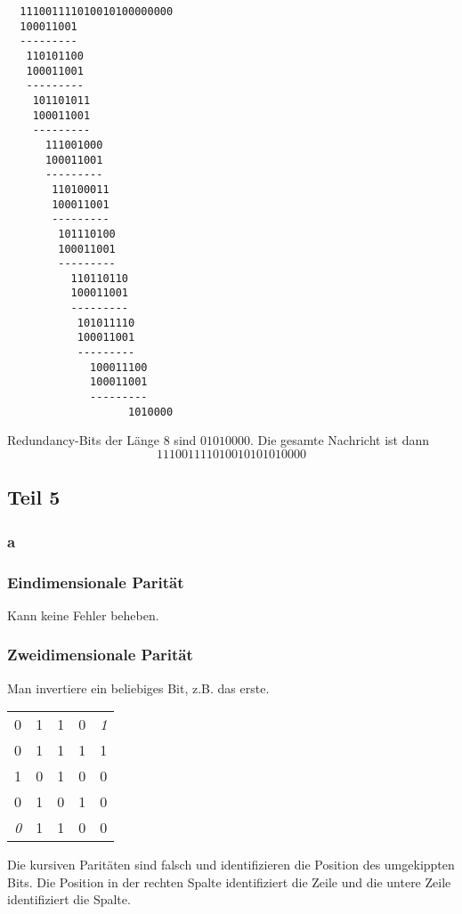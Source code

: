\documentclass[10pt,a4paper]{article}
\begin{document}
\begin{verbatim}
  111001111010010100000000
  100011001
  ---------
   110101100
   100011001
   ---------
    101101011
    100011001
    ---------
      111001000
      100011001
      ---------
       110100011
       100011001
       ---------
        101110100
        100011001
        ---------
          110110110
          100011001
          ---------
           101011110
           100011001
           ---------
             100011100
             100011001
             ---------
                   1010000
\end{verbatim}

Redundancy-Bits der Länge $8$ sind $01010000$. Die gesamte Nachricht ist dann
\begin{equation}
  111001111010010101010000
\end{equation}

\subsection{Teil 5}

\subsubsection{a}

\subsubsection{Eindimensionale Parität}

Kann keine Fehler beheben.

\subsubsection{Zweidimensionale Parität}

Man invertiere ein beliebiges Bit, z.B. das erste.
\\
\begin{tabular}{cccc|c}
  0 & 1 & 1 & 0 & \textit{1}\\
  0 & 1 & 1 & 1 & 1\\
  1 & 0 & 1 & 0 & 0\\
  0 & 1 & 0 & 1 & 0\\\hline
  \textit{0} & 1 & 1 & 0 & 0
\end{tabular}
Die kursiven Paritäten sind falsch und identifizieren die Position des
umgekippten Bits. Die Position in der rechten Spalte identifiziert die Zeile und
die untere Zeile identifiziert die Spalte.
\end{document}
